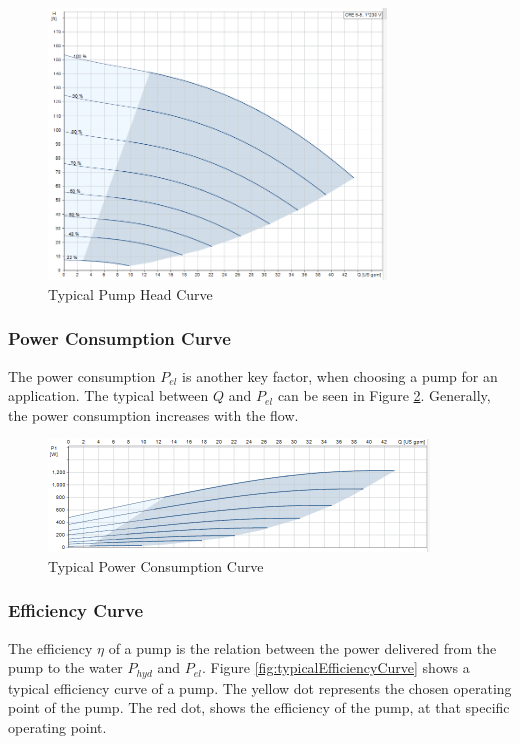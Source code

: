 \begin{figure}[h]
	\centering
	\includegraphics[width=0.8\textwidth]{figures/03physicalSetup/typicalHeadCurve.PNG}
	\caption{Typical Pump Head Curve}
	\label{fig:typicalPumpCurve}
\end{figure}

\subsubsection{Power Consumption Curve}
The power consumption $P_{el}$ is another key factor,
when choosing a pump for an application.
The typical between $Q$ and $P_{el}$ can be seen in Figure \ref{fig:typicalPowerConsumptionCurve}.
Generally, the power consumption increases with the flow.

\begin{figure}[h]
	\centering
	\includegraphics[width=0.9\textwidth]{figures/03physicalSetup/typicalPowerConsumptionCurve.PNG}
	\caption{Typical Power Consumption Curve}
	\label{fig:typicalPowerConsumptionCurve}
\end{figure}

\subsubsection{Efficiency Curve}
The efficiency $\eta$ of a pump is the relation between the power delivered from the pump to the water $P_{hyd}$ and $P_{el}
$.
Figure \ref{fig:typicalEfficiencyCurve} shows a typical efficiency curve of a pump. The yellow dot represents the 
chosen operating point of the pump. The red dot, shows the efficiency of the pump, at that specific operating point.

